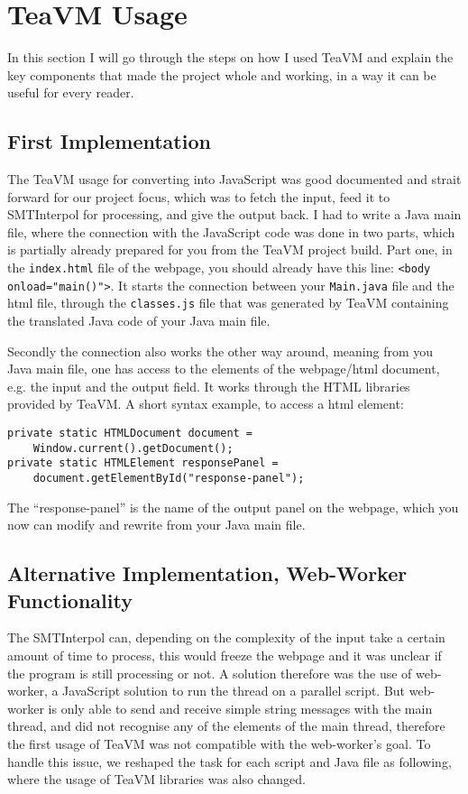 \documentclass[12pt]{article}
\begin{document}
\section{TeaVM Usage}
In this section I will go through the steps on how I used TeaVM and explain the key components that made the project whole and working, in a way it can be useful for every reader. 

\subsection{First Implementation}

The TeaVM usage for converting into JavaScript was good documented and strait forward for our project focus, which was to fetch the input, feed it to SMTInterpol for processing, and give the output back. I had to write a Java main file, where the connection with the JavaScript code was done in two parts, which is partially already prepared for you from the TeaVM project build\cite{2}.
Part one, in the \verb|index.html| file of the webpage, you should already have this line: \verb|<body onload="main()">|. It starts the connection between your \verb|Main.java| file and the html file, through the \verb|classes.js| file that was generated by TeaVM containing the translated Java code of your Java main file.

Secondly the connection also works the other way around, meaning from you Java main file, one has access to the elements of the webpage/html document, e.g. the input and the output field. It works through the HTML libraries provided by TeaVM. A short syntax example, to access a html element:
\begin{verbatim}
private static HTMLDocument document = 
    Window.current().getDocument();
private static HTMLElement responsePanel =
    document.getElementById("response-panel");
\end{verbatim}
The ``response-panel'' is the name of the output panel on the webpage, which you now can modify and rewrite from your Java main file. 

\subsection{Alternative Implementation, Web-Worker Functionality}

The SMTInterpol can, depending on the complexity of the input take a certain amount of time to process, this would freeze the webpage and it was unclear if the program is still processing or not. A solution therefore was the use of web-worker, a JavaScript solution to run the thread on a parallel script.
But web-worker is only able to send and receive simple string messages with the main thread, and did not recognise any of the elements of the main thread, therefore the first usage of TeaVM was not compatible with the web-worker's goal. To handle this issue, we reshaped the task for each script and Java file as following, where the usage of TeaVM libraries was also changed.
\end{document}
